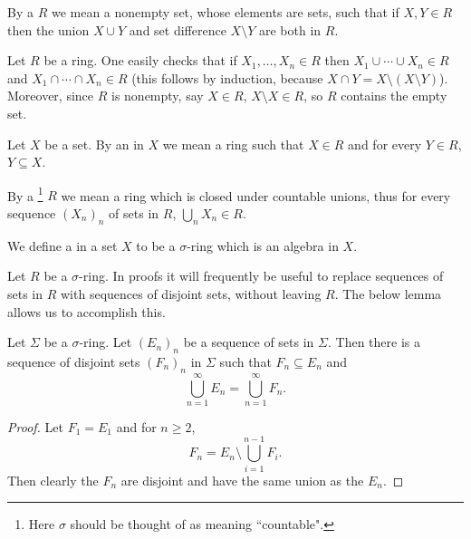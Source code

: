 \begin{definition}
By a  $R$ we mean a nonempty set, whose elements are sets, such that if $X, Y \in R$ then the union $X \cup Y$ and set difference $X \setminus Y$ are both in $R$.
\end{definition}

\begin{subsec}
Let $R$ be a ring.
One easily checks that if $X_1, \dots, X_n \in R$ then $X_1 \cup \cdots \cup X_n \in R$ and $X_1 \cap \cdots \cap X_n \in R$ (this follows by induction, because $X \cap Y = X \setminus (X \setminus Y)$).
Moreover, since $R$ is nonempty, say $X \in R$, $X \setminus X \in R$, so $R$ contains the empty set.
\end{subsec}

\begin{definition}
Let $X$ be a set. By an  in $X$ we mean a ring such that $X \in R$ and for every $Y \in R$, $Y \subseteq X$.
\end{definition}

\begin{definition}
By a \footnote{Here $\sigma$ should be thought of as meaning ``countable".} $R$ we mean a ring which is closed under countable unions, thus for every sequence $(X_n)_n$ of sets in $R$, $\bigcup_n X_n \in R$.

We define a  in a set $X$ to be a $\sigma$-ring which is an algebra in $X$.
\end{definition}

\begin{subsec}
Let $R$ be a $\sigma$-ring.
In proofs it will frequently be useful to replace sequences of sets in $R$ with sequences of disjoint sets, without leaving $R$.
The below lemma allows us to accomplish this.
\end{subsec}

\begin{lemma}
Let $\Sigma$ be a $\sigma$-ring.
Let $(E_n)_n$ be a sequence of sets in $\Sigma$. Then there is a sequence of disjoint sets $(F_n)_n$ in $\Sigma$ such that $F_n \subseteq E_n$ and
\[\bigcup_{n=1}^\infty E_n = \bigcup_{n=1}^\infty F_n.\]
\end{lemma}
\begin{proof}
Let $F_1 = E_1$ and for $n \geq 2$,
\[F_n = E_n \setminus \bigcup_{i=1}^{n-1} F_i.\]
Then clearly the $F_n$ are disjoint and have the same union as the $E_n$.
\end{proof}

